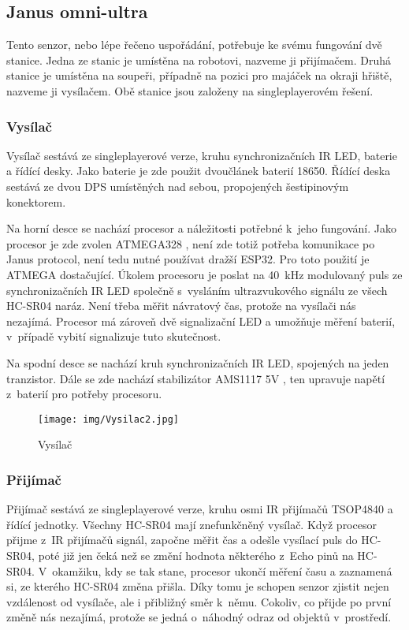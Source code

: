 \subsection{Janus omni-ultra}
Tento senzor, nebo lépe řečeno uspořádání, potřebuje ke svému fungování dvě stanice.
Jedna ze stanic je umístěna na robotovi, nazveme ji přijímačem.
Druhá stanice je umístěna na soupeři, případně na pozici pro majáček na okraji hřiště, nazveme ji vysílačem.
Obě stanice jsou založeny na singleplayerovém řešení.

\subsubsection{Vysílač}
Vysílač sestává ze singleplayerové verze, kruhu synchronizačních IR LED, baterie a řídící desky.
Jako baterie je zde použit dvoučlánek baterií 18650.
Řídící deska sestává ze dvou DPS umístěných nad sebou, propojených šestipinovým konektorem.

Na horní desce se nachází procesor a náležitosti potřebné k~jeho fungování.
Jako procesor je zde zvolen ATMEGA328 \cite{atmega}, není zde totiž potřeba komunikace po Janus protocol, není tedu nutné používat dražší ESP32.
Pro toto použití je ATMEGA dostačující.
Úkolem procesoru je poslat na 40~kHz modulovaný puls ze synchronizačních IR LED společně s~vysláním ultrazvukového signálu ze všech HC-SR04 naráz. 
Není třeba měřit návratový čas, protože na vysílači nás nezajímá.
Procesor má zároveň dvě signalizační LED a umožňuje měření baterií, v~případě vybití signalizuje tuto skutečnost.

Na spodní desce se nachází kruh synchronizačních IR LED, spojených na jeden tranzistor.
Dále se zde nachází stabilizátor AMS1117 5V \cite{ams1117}, ten upravuje napětí z~baterií pro potřeby procesoru.

\begin{figure}
    \begin{small}
        \begin{center}
            \texttt{[image: img/Vysilac2.jpg]}
        \end{center}
        \caption{Vysílač}
        \label{fig: Ultrasonic}
    \end{small}
\end{figure}


\subsubsection{Přijímač}
Přijímač sestává ze singleplayerové verze, kruhu osmi IR přijímačů TSOP4840 a řídící jednotky.
Všechny HC-SR04 mají znefunkčněný vysílač.
Když procesor přijme z~IR přijímačů signál, započne měřit čas a odešle vysílací puls do HC-SR04, poté již jen čeká než se změní hodnota některého z~Echo pinů na HC-SR04.
V~okamžiku, kdy se tak stane, procesor ukončí měření času a zaznamená si, ze kterého HC-SR04 změna přišla.
Díky tomu je schopen senzor zjistit nejen vzdálenost od vysílače, ale i přibližný směr k~němu.
Cokoliv, co přijde po první změně nás nezajímá, protože se jedná o~náhodný odraz od objektů v~prostředí.

